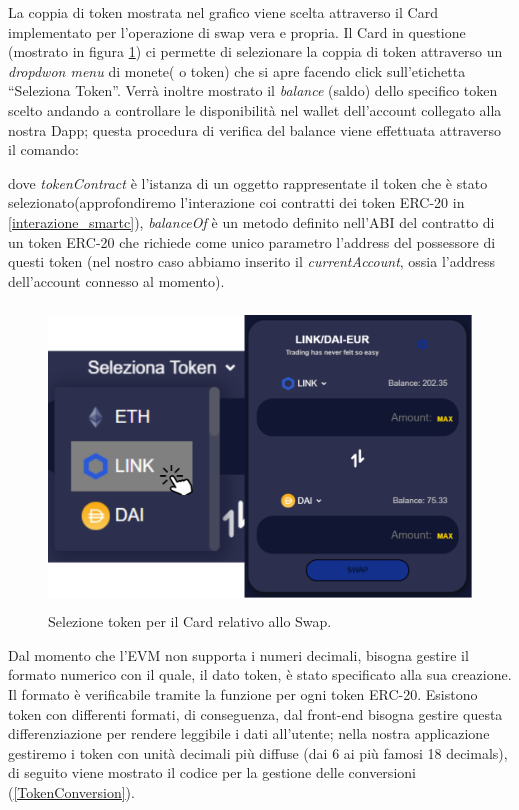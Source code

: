 La coppia di token mostrata nel grafico viene scelta attraverso il Card implementato per l'operazione di swap vera e propria. Il Card in questione (mostrato in figura \ref{swapCard}) ci permette di selezionare la coppia di token attraverso un \textit{dropdwon menu} di monete( o token) che si apre facendo click sull'etichetta “Seleziona Token”. Verrà inoltre mostrato il \textit{balance} (saldo) dello specifico token scelto andando a controllare le disponibilità nel wallet dell'account collegato alla nostra Dapp; questa procedura di verifica del balance viene effettuata attraverso il comando: 
\begin{quote}
\end{quote}\label{tokenContract}

dove \textit{tokenContract} è l'istanza di un oggetto  rappresentate il token che è stato selezionato(approfondiremo l'interazione coi contratti dei token ERC-20 in \ref{interazione_smartc}), \textit{balanceOf} è un metodo definito nell'ABI del contratto di un token ERC-20 che richiede come unico parametro l'address del possessore di questi token (nel nostro caso abbiamo inserito il \textit{currentAccount}, ossia l'address dell'account connesso al momento).



\begin{figure}[h]
    \centering
    \includegraphics[width=12cm,height=8cm]{Immagini/SwapCard.png}
    \caption[Selezione dei token per il Card relativo allo Swap]{Selezione token per il Card relativo allo Swap.}
    \label{swapCard}
\end{figure}
Dal momento che l'EVM non supporta i numeri decimali, bisogna gestire il formato numerico con il quale, il dato token, è stato specificato alla sua creazione. Il formato è verificabile tramite la funzione  per ogni token ERC-20. 
Esistono token con differenti formati, di conseguenza, dal front-end bisogna gestire questa differenziazione per rendere leggibile i dati all'utente; nella nostra applicazione gestiremo i token con unità decimali più diffuse (dai 6 ai più famosi 18 decimals), di seguito viene mostrato il codice per la gestione delle conversioni (\ref{TokenConversion}).

